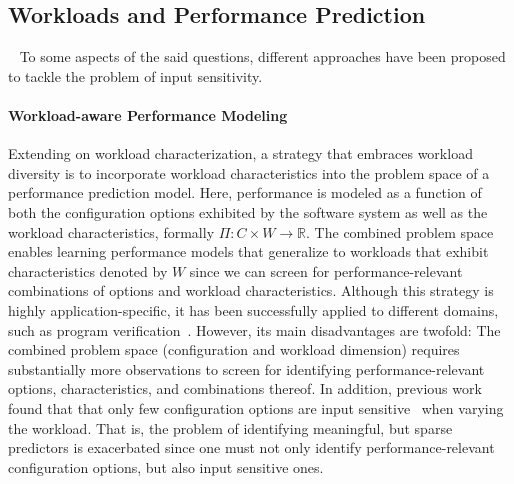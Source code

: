 \subsection{Workloads and Performance Prediction} ~\label{sec:strategies}
To some aspects of the said questions, different approaches have been proposed to tackle the problem of input sensitivity.

\paragraph{Workload-aware Performance Modeling}\label{sec:workload-aware}
Extending on workload characterization, a strategy that embraces workload diversity is to incorporate workload characteristics into the problem space of a performance prediction model. Here, performance is modeled as a function of both the configuration options exhibited by the software system as well as the workload characteristics, formally $\Pi: C \times W \rightarrow \mathbb{R}$.
The combined problem space enables learning performance models that generalize to workloads that exhibit characteristics denoted by $W$ since we can screen for performance-relevant combinations of options and workload characteristics. Although this strategy is highly application-specific, it has been successfully applied to different domains, such as program verification~\cite{koc_satune_2021}. However, its main disadvantages are twofold: The combined problem space (configuration and workload dimension) requires substantially more observations to screen for identifying performance-relevant options, characteristics, and combinations thereof. In addition, previous work  found that that only few configuration options are input sensitive~\cite{jamishidi_transfer_2017} when varying the workload. That is, the problem of identifying meaningful, but sparse predictors is exacerbated since one must not only identify performance-relevant configuration options, but also input sensitive ones.

